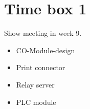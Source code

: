 \section{Time box 1}
Show meeting in week 9.
\begin{itemize}
	\item CO-Module-design
	\item Print connector
	\item Relay server
	\item PLC module
\end{itemize}